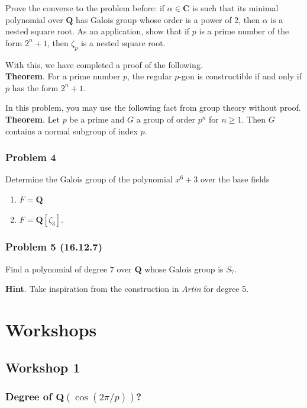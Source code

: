 \documentclass[11pt]{article}
\begin{document}
Prove the converse to the problem before: if \(\alpha \in \mathbf{C}\) is such that its minimal polynomial over \(\mathbf{Q}\) has Galois group whose order is a power of 2, then \(\alpha\) is a nested square root.
As an application, show that if \(p\) is a prime number of the form \(2^n+1\), then \(\zeta_p\) is a nested square root.

With this, we have completed a proof of the following.\\
\textbf{Theorem}. For a prime number \(p\), the regular \(p\)-gon is constructible if and only if \(p\) has the form \(2^n+1\).

In this problem, you may use the following fact from group theory without proof. \\
\textbf{Theorem}. Let \(p\) be a prime and \(G\) a group of order \(p^{n}\) for \(n \geq 1\).  Then \(G\) contains a normal subgroup of index \(p\).
\subsubsection{Problem 4}
\label{sec:org2b62128}

Determine the Galois group of the polynomial \(x^6+3\) over the base fields
\begin{enumerate}
\item \(F = \mathbf{Q}\)
\item \(F = \mathbf{Q}[\zeta_3]\).
\end{enumerate}
\subsubsection{Problem 5 (16.12.7)}
\label{sec:org516ff24}

Find a polynomial of degree \(7\) over \(\mathbf{Q}\) whose Galois group is \(S_7\).

\textbf{Hint}. Take inspiration from the construction in \emph{Artin} for degree 5.
\section{Workshops}
\label{sec:org6444a5f}
\subsection{Workshop 1}
\label{sec:orgb07a56f}
\subsubsection{Degree of \(\mathbf{Q}(\cos (2\pi/p))\)?}
\label{sec:orgaf64370}
\end{document}
